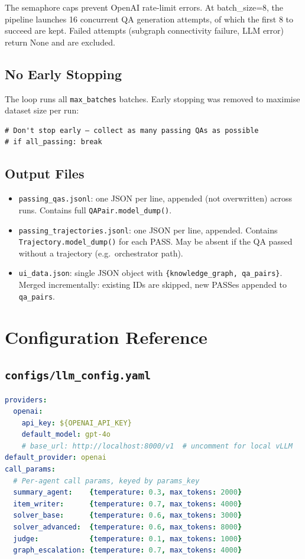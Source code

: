 \documentclass[11pt,a4paper]{article}
\begin{document}
The semaphore caps prevent OpenAI rate-limit errors. At batch\_size=8, the pipeline launches 16 concurrent QA generation attempts, of which the first 8 to succeed are kept. Failed attempts (subgraph connectivity failure, LLM error) return None and are excluded.

\subsection{No Early Stopping}

The loop runs all \texttt{max\_batches} batches. Early stopping was removed to maximise dataset size per run:
\begin{lstlisting}[style=py]
# Don't stop early — collect as many passing QAs as possible
# if all_passing: break
\end{lstlisting}

\subsection{Output Files}

\begin{itemize}[leftmargin=*,noitemsep]
  \item \texttt{passing\_qas.jsonl}: one JSON per line, appended (not overwritten) across runs. Contains full \texttt{QAPair.model\_dump()}.
  \item \texttt{passing\_trajectories.jsonl}: one JSON per line, appended. Contains \texttt{Trajectory.model\_dump()} for each PASS. May be absent if the QA passed without a trajectory (e.g.\ orchestrator path).
  \item \texttt{ui\_data.json}: single JSON object with \texttt{\{knowledge\_graph, qa\_pairs\}}. Merged incrementally: existing IDs are skipped, new PASSes appended to \texttt{qa\_pairs}.
\end{itemize}

\section{Configuration Reference}
\label{sec:config}

\subsection{\texttt{configs/llm\_config.yaml}}

\begin{lstlisting}[style=py, language=yaml]
providers:
  openai:
    api_key: ${OPENAI_API_KEY}
    default_model: gpt-4o
    # base_url: http://localhost:8000/v1  # uncomment for local vLLM
default_provider: openai
call_params:
  # Per-agent call params, keyed by params_key
  summary_agent:    {temperature: 0.3, max_tokens: 2000}
  item_writer:      {temperature: 0.7, max_tokens: 4000}
  solver_base:      {temperature: 0.6, max_tokens: 3000}
  solver_advanced:  {temperature: 0.6, max_tokens: 8000}
  judge:            {temperature: 0.1, max_tokens: 1000}
  graph_escalation: {temperature: 0.7, max_tokens: 4000}
\end{lstlisting}
\end{document}
